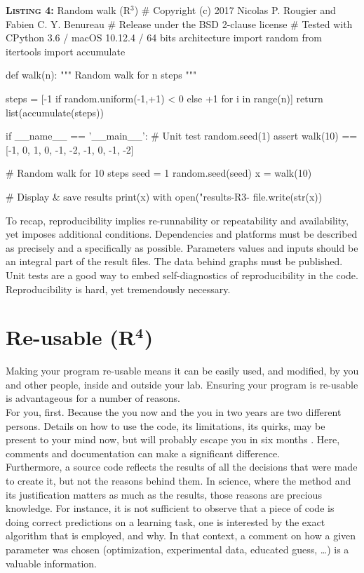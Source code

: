 \documentclass[a4paper,11pt]{article}
\begin{document}
\begin{code}{\textbf{\textsc{Listing 4:}} Random walk (R$^3$)}
# Copyright (c) 2017 Nicolas P. Rougier and Fabien C. Y. Benureau
# Release under the BSD 2-clause license
# Tested with CPython 3.6 / macOS 10.12.4 / 64 bits architecture
import random
from itertools import accumulate

def walk(n):
    """ Random walk for n steps """
  
    steps = [-1 if random.uniform(-1,+1) < 0 else +1 for i in range(n)]
    return list(accumulate(steps))

if __name__ == '__main__':
    # Unit test
    random.seed(1)
    assert walk(10) == [-1, 0, 1, 0, -1, -2, -1, 0, -1, -2]

    # Random walk for 10 steps
    seed = 1
    random.seed(seed)
    x = walk(10)
    
    # Display & save results
    print(x)
    with open("results-R3-%
        file.write(str(x))
\end{code}

To recap, reproducibility implies re-runnability or repeatability and availability, yet  imposes additional conditions. Dependencies and platforms must be described as precisely and a specifically as possible. Parameters values and inputs should be an integral part of the result files. The data behind graphs must be published. Unit tests are a good way to embed self-diagnostics of reproducibility in the code. Reproducibility is hard, yet tremendously necessary.


\clearpage
\section*{Re-usable (R$^{\mathbf 4}$)}

Making your program re-usable means it can be easily used, and modified, by you and other people, inside and outside your lab. Ensuring your program is re-usable is advantageous for a number of reasons.\\

For you, first. Because the you now and the you in two years are two different persons. Details on how to use the code, its limitations, its quirks, may be present to your mind now, but will probably escape you in six months \parencite{Donoho:2009}. Here, comments and documentation can make a significant difference.\\

Furthermore, a source code reflects the results of all the decisions that were made to create it, but not the reasons behind them. In science, where the method and its justification matters as much as the results, those reasons are precious knowledge. For instance, it is not sufficient to observe that a piece of code is doing correct predictions on a learning task, one is interested by the exact algorithm that is employed, and why. In that context, a comment on how a given parameter was chosen (optimization, experimental data, educated guess, …) is a valuable information.\\
\end{document}
